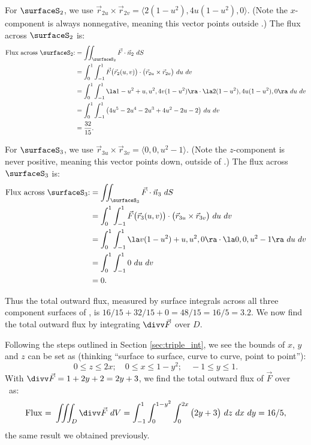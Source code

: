 {For $\surfaceS_2$, we use $\vec r_{2u}\times\vec r_{2v} = \langle 2(1-u^2), 4u(1-u^2),0\rangle$. (Note the $x$-component is always nonnegative, meaning this vector points outside \surfaceS.) The flux across $\surfaceS_2$ is:
\begin{align*}
\text{Flux across $\surfaceS_2$:} &= \iint_{\surfaceS_2} \vec F\cdot \vec n_2\ dS \\
		&= \int_0^1\int_{-1}^1 \vec F\big(\vec r_2(u,v)\big)\cdot \big(\vec r_{2u}\times\vec r_{2v}\big)\ du\ dv\\
		&= \int_0^1\int_{-1}^1 \la 1-u^2+u, u^2, 4v(1-u^2)\ra \cdot \la 2(1-u^2), 4u(1-u^2),0\ra\ du\ dv\\
		&= \int_0^1\int_{-1}^1 \big(4u^5-2u^4-2u^3+4u^2-2u-2\big)\ du\ dv\\
		&= \frac{32}{15}.
\end{align*}


For $\surfaceS_3$, we use $\vec r_{3u}\times\vec r_{3v} = \langle 0,0,u^2-1\rangle$. (Note the $z$-component is never positive, meaning this vector points down, outside of \surfaceS.) The flux across $\surfaceS_3$ is:
\begin{align*}
\text{Flux across $\surfaceS_3$:} &= \iint_{\surfaceS_3} \vec F\cdot \vec n_3\ dS \\
		&= \int_0^1\int_{-1}^1 \vec F\big(\vec r_3(u,v)\big)\cdot \big(\vec r_{3u}\times\vec r_{3v}\big)\ du\ dv\\
		&= \int_0^1\int_{-1}^1 \la v(1-u^2)+u,u^2,0\ra \cdot \la 0,0,u^2-1\ra\ du\ dv\\
		&= \int_0^1\int_{-1}^1 0\ du\ dv\\
		&= 0.
\end{align*}

Thus the total outward flux, measured by surface integrals across all three component surfaces of \surfaceS, is $16/15+32/15+0 = 48/15 = 16/5 = 3.2$. We now find the total outward flux by integrating $\divv \vec F$ over $D$.

Following the steps outlined in Section \ref{sec:triple_int}, we see the bounds of $x$, $y$ and $z$ can be set as (thinking ``surface to surface, curve to curve, point to point''):
$$0\leq z\leq 2x;\quad 0\leq x\leq 1-y^2;\quad -1\leq y\leq 1.$$
With $\divv \vec F = 1+2y+2 = 2y+3$, we find the total outward flux of $\vec F$ over \surfaceS\ as:
$$\text{Flux = } \iiint_D\divv \vec F\ dV = \int_{-1}^1\int_0^{1-y^2}\int_0^{2x}\big(2y+3\big)\ dz\ dx\ dy = 16/5,$$
the same result we obtained previously.
}\\

